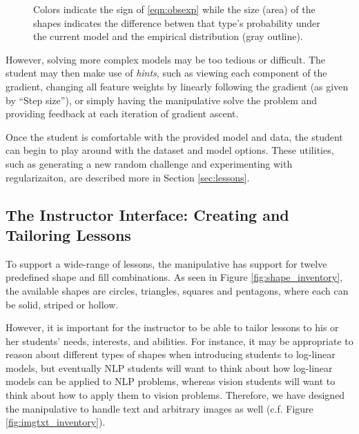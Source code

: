 \documentclass[11pt,letterpaper]{article}
\begin{document}
\begin{figure}[t]
\caption{Colors indicate the sign of \eqref{eqn:obsexp} while the size (area) of 
the shapes indicates the difference betwen that type's probability under the 
current model and the empirical distribution (gray outline).}
\label{fig:colorsize_inventory}
\end{figure}

However, solving more complex models may be too tedious or difficult. 
The student may then make use of \textit{hints}, such as
viewing each component of the gradient, changing all feature weights by 
linearly following the gradient (as given by ``Step size''), or simply having
the manipulative solve the problem and providing feedback at each iteration 
of gradient ascent.

Once the student is comfortable with the provided model and data, the student
can begin to play around with the dataset and model options. These utilities, such as
generating a new random challenge and experimenting with regularizaiton, 
are described more in Section \ref{sec:lessons}.


\subsection{The Instructor Interface: Creating and Tailoring Lessons}\label{sec:tailoring}
To support a wide-range of lessons, the manipulative has support for twelve predefined shape and fill combinations.
As seen in Figure \ref{fig:shape_inventory}, the available shapes are circles, triangles, squares and pentagons,
where each can be solid, striped or hollow.

However, it is important for the instructor to be able to tailor lessons to his or her students' needs, 
interests, and abilities. For instance, it may be appropriate to reason about different types of shapes
when introducing students to log-linear models, but eventually NLP students will want to think about 
how log-linear models can be applied to NLP problems, whereas vision students will want to think about 
how to apply them to vision problems. Therefore, we have designed the manipulative to handle text
and arbitrary images as well (c.f. Figure \ref{fig:imgtxt_inventory}).
\end{document}
